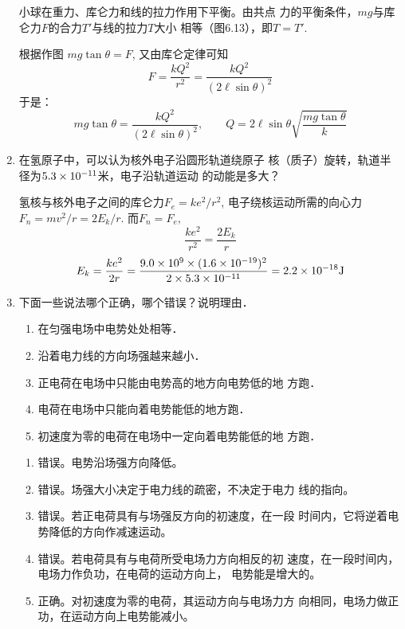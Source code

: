 \begin{enumerate}
\begin{figure}[htp]
\begin{minipage}[t]{0.48\textwidth}
\begin{tikzpicture}[>=latex]
\end{tikzpicture}
\caption{}
\end{minipage}
\end{figure}

\begin{solution}
    小球在重力、库仑力和线的拉力作用下平衡。由共点
    力的平衡条件，$mg$与库仑力$F$的合力$T'$与线的拉力$T$大小
    相等（图6.13），即$T=T'$.

    根据作图 $mg\tan\theta=F$, 又由库仑定律可知
\[F=\frac{kQ^2}{r^2}=\frac{kQ^2}{(2\ell\sin\theta)^2}\]
于是：
\[mg\tan\theta=\frac{kQ^2}{(2\ell\sin\theta)^2},\qquad Q=2\ell\sin\theta\sqrt{\frac{mg\tan\theta}{k}}\]
\end{solution}


\item 在氢原子中，可以认为核外电子沿圆形轨道绕原子
核（质子）旋转，轨道半径为$5.3\x10^{-11}$米，电子沿轨道运动
的动能是多大？

\begin{solution}
    氢核与核外电子之间的库仑力$F_e=ke^2/r^2$, 
    电子绕核运动所需的向心力$F_n=mv^2/r=2E_k/r$.
    而$F_n=F_e$,
    \[\frac{ke^2}{r^2}=\frac{2E_k}{r}\]
\[E_k=\frac{ke^2}{2r}=\frac{9.0\x10^9\x(1.6\x10^{-19})^2}{2\x 5.3\x 10^{-11}}=2.2\x 10^{-18}{\rm J}\]
\end{solution}

\item 下面一些说法哪个正确，哪个错误？说明理由．
\begin{enumerate}
\item 在匀强电场中电势处处相等．
\item 沿着电力线的方向场强越来越小．
\item 正电荷在电场中只能由电势高的地方向电势低的地
方跑．
\item 电荷在电场中只能向着电势能低的地方跑．
\item 初速度为零的电荷在电场中一定向着电势能低的地
方跑．
\end{enumerate}

\begin{solution}
\begin{enumerate}
    \item 错误。电势沿场强方向降低。
    \item 错误。场强大小决定于电力线的疏密，不决定于电力
    线的指向。
    \item 错误。若正电荷具有与场强反方向的初速度，在一段
    时间内，它将逆着电势降低的方向作减速运动。
    \item 错误。若电荷具有与电荷所受电场力方向相反的初
    速度，在一段时间内，电场力作负功，在电荷的运动方向上，
    电势能是增大的。
    \item 正确。对初速度为零的电荷，其运动方向与电场力方
    向相同，电场力做正功，在运动方向上电势能减小。
\end{enumerate}
\end{solution}


\end{enumerate}
